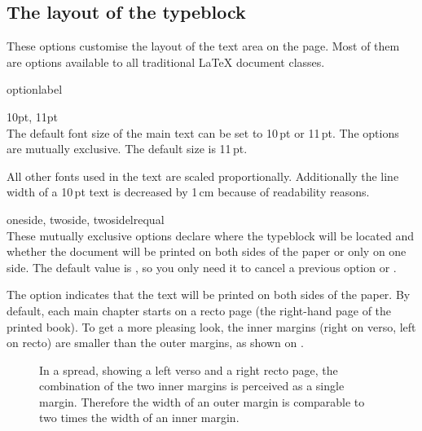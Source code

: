 \subsection{The layout of the typeblock}
These options customise the layout of the text area on the page. Most of
them are options available to all traditional LaTeX document classes.

\begin{labelled}{optionlabel}
\item[10pt, 11pt]\\
  The default font size of the main text can be set to 10\,pt or 11\,pt.
  The options are mutually exclusive. The default size is 11\,pt.

  All other fonts used in the text are scaled proportionally. Additionally
  the line width of a 10\,pt text is decreased by 1\,cm because of
  readability reasons.

\item[oneside, twoside, twosidelrequal]%
  \\
  These mutually exclusive options declare where the typeblock will be located
  and whether the document will be printed on both sides of the paper or only
  on one side. The default value is , so you only need it
  to cancel a previous option  or .

  The  option indicates that the text will be printed on both
  sides of the paper. By default, each main chapter starts on a recto page (the
  right-hand page of the printed book). To get a more pleasing look, the inner
  margins (right on verso, left on recto) are smaller than the outer margins,
  as shown on .
  \begin{figure}
    \centering
    \setlength\unitlength{.5pt}
    \newcommand*\typeblock[1]{%
      \draw[thin] (#1) rectangle +(140,215);
      \draw[thin] (#1) -- +(140,215);
      \draw[thin] (#1) +(0,215) -- +(140,0);
    }
    \medskip
    \caption{In a spread, showing a left verso and a right recto page, the
      combination of the two inner margins is perceived as a single margin.
      Therefore the width of an outer margin is comparable to two times the
      width of an inner margin.}
    \label{fig:spread}
  \end{figure}


\end{labelled}
